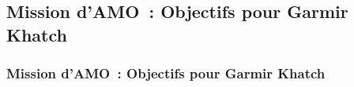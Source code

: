\subsection{Mission d'AMO~: Objectifs pour Garmir Khatch}
\begin{frame}
	\frametitle{Mission d'AMO~: Objectifs pour Garmir Khatch}
\end{frame}

